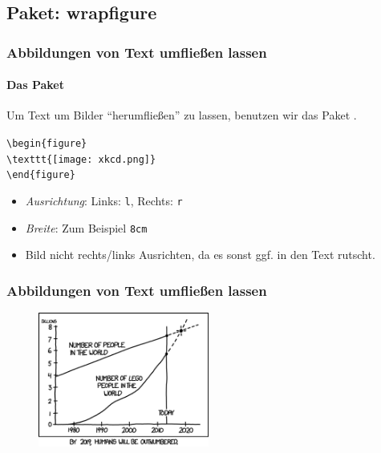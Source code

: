\subsection{Paket: wrapfigure}

\begin{frame}[fragile]
\frametitle{Abbildungen von Text umfließen lassen}
\framesubtitle{Das Paket }

Um Text um Bilder \enquote{herumfließen} zu lassen, benutzen wir das Paket .

\begin{codeblock}
\verb|\begin{figure}|\\
\verb|\texttt{[image: xkcd.png]}|\\
\verb|\end{figure}|
\end{codeblock}

\begin{itemize}
 \item \textit{Ausrichtung}: Links: \texttt{l}, Rechts: \texttt{r}
 \item \textit{Breite}: Zum Beispiel \texttt{8cm}
 \item Bild nicht rechts/links Ausrichten, da es sonst ggf. in den Text rutscht.
\end{itemize}

\end{frame}

\begin{frame}[fragile]
\frametitle{Abbildungen von Text umfließen lassen}
\begin{figure}
\includegraphics[width=0.5\textwidth]{images/xkcd.png}
\end{figure}
\footnotesize \lipsum[2]
\end{frame}

